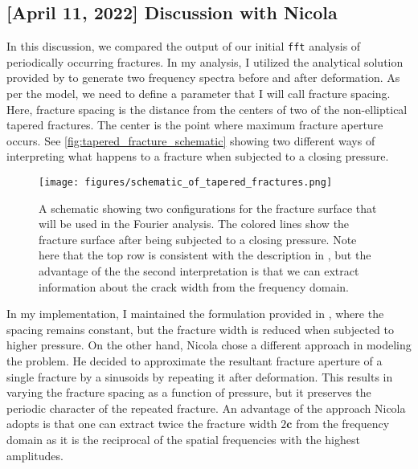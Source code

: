 \documentclass[12pt,titlepage]{article}
\begin{document}
\subsection{[April 11, 2022] Discussion with Nicola}
In this discussion, we compared the output of our initial \texttt{fft} analysis of periodically occurring fractures. In my analysis, I utilized the analytical solution provided by \cite{Mavko1978} to generate two frequency spectra before and after deformation. As per the \citep{Mavko1978} model, we need to define a parameter that I will call fracture spacing. Here, fracture spacing is the distance from the centers of two of the non-elliptical tapered fractures. The center is the point where maximum fracture aperture occurs. See \autoref{fig:tapered_fracture_schematic} showing two different ways of interpreting what happens to a fracture when subjected to a closing pressure.

\begin{figure}
\centering
\texttt{[image: figures/schematic\_of\_tapered\_fractures.png]}
\caption{A schematic showing two configurations for the fracture surface that will be used in the Fourier analysis. The colored lines show the fracture surface after being subjected to a closing pressure. Note here that the top row is consistent with the description in \cite{Mavko1978}, but the advantage of the the second interpretation is that we can extract information about the crack width from the frequency domain.}
\label{fig:tapered_fracture_schematic}
\end{figure}

In my implementation, I maintained the formulation provided in \citep{Mavko1978}, where the spacing remains constant, but the fracture width is reduced when subjected to higher pressure. On the other hand, Nicola chose a different approach in modeling the problem. He decided to approximate the resultant fracture aperture of a single fracture by a sinusoids by repeating it after deformation. This results in varying the fracture spacing as a function of pressure, but it preserves the periodic character of the repeated fracture. An advantage of the approach Nicola adopts is that one can extract twice the fracture width $2\mathbf{c}$ from the frequency domain as it is the reciprocal of the spatial frequencies with the highest amplitudes. 
\end{document}
